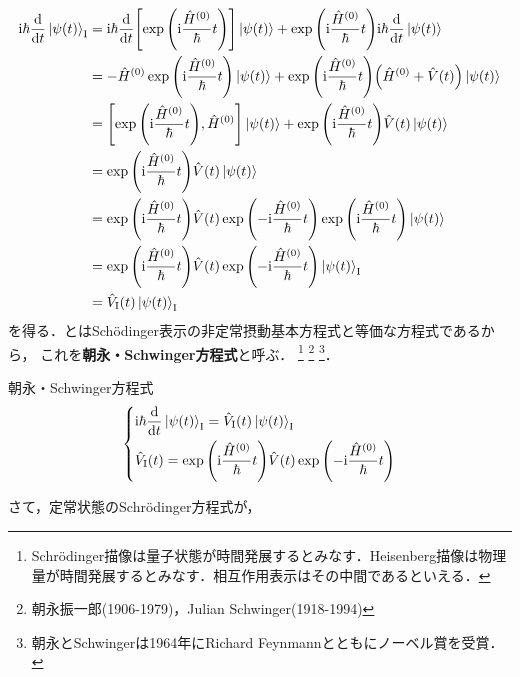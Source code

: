 \documentclass{report}
\begin{document}
  \begin{align}
    \mathrm{i}\hbar\dv{t}\ket{\psi(t)}_{\mathrm{I}} &= \mathrm{i}\hbar\dv{t}\qty[\exp\qty(\mathrm{i}\frac{\hat{H}^{(0)}}{\hbar}t)]\ket{\psi(t)} + \exp\qty(\mathrm{i}\frac{\hat{H}^{(0)}}{\hbar}t)\mathrm{i}\hbar\dv{t}\ket{\psi(t)} \\
    &= -\hat{H}^{(0)}\exp\qty(\mathrm{i}\frac{\hat{H}^{(0)}}{\hbar}t)\ket{\psi(t)} + \exp\qty(\mathrm{i}\frac{\hat{H}^{(0)}}{\hbar}t)\qty(\hat{H}^{(0)} + \hat{V}(t))\ket{\psi(t)} \\ 
    &= \qty[\exp\qty(\mathrm{i}\frac{\hat{H}^{(0)}}{\hbar}t), \hat{H}^{(0)}]\ket{\psi(t)} + \exp\qty(\mathrm{i}\frac{\hat{H}^{(0)}}{\hbar}t)\hat{V}(t)\ket{\psi(t)} \\ 
    &= \exp\qty(\mathrm{i}\frac{\hat{H}^{(0)}}{\hbar}t)\hat{V}(t)\ket{\psi(t)} \\
    &= \exp\qty(\mathrm{i}\frac{\hat{H}^{(0)}}{\hbar}t)\hat{V}(t)\exp\qty(-\mathrm{i}\frac{\hat{H}^{(0)}}{\hbar}t)\exp\qty(\mathrm{i}\frac{\hat{H}^{(0)}}{\hbar}t)\ket{\psi(t)} \\
    &= \exp\qty(\mathrm{i}\frac{\hat{H}^{(0)}}{\hbar}t)\hat{V}(t)\exp\qty(-\mathrm{i}\frac{\hat{H}^{(0)}}{\hbar}t)\ket{\psi(t)}_{\mathrm{I}} \\
    &= \hat{V}_{\mathrm{I}}(t)\ket{\psi(t)}_{\mathrm{I}}\label{time-dependent-schrodinger-eq-re-1st-eq-interaction-picture}
  \end{align}
  を得る．とはSch\"odinger表示の非定常摂動基本方程式と等価な方程式であるから，
  これを\textbf{朝永・Schwinger方程式}と呼ぶ．
  \footnote{Schrödinger描像は量子状態が時間発展するとみなす．Heisenberg描像は物理量が時間発展するとみなす．相互作用表示はその中間であるといえる．}  
  \footnote{朝永振一郎(1906-1979)，Julian Schwinger(1918-1994)}
  \footnote{朝永とSchwingerは1964年にRichard Feynmannとともにノーベル賞を受賞．}．
  \begin{itembox}[l]{朝永・Schwinger方程式}
    \begin{align}
      \begin{dcases}
        \mathrm{i}\hbar\dv{t}\ket{\psi(t)}_{\mathrm{I}} = \hat{V}_{\mathrm{I}}(t)\ket{\psi(t)}_{\mathrm{I}} \label{tomonaga-schwinger}\\
        \hat{V}_{\mathrm{I}}(t) = \exp\qty(\mathrm{i}\frac{\hat{H}^{(0)}}{\hbar}t)\hat{V}(t)\exp\qty(-\mathrm{i}\frac{\hat{H}^{(0)}}{\hbar}t)
      \end{dcases}
    \end{align}
  \end{itembox}
  \par
  さて，定常状態のSchr\"odinger方程式が，
\end{document}
